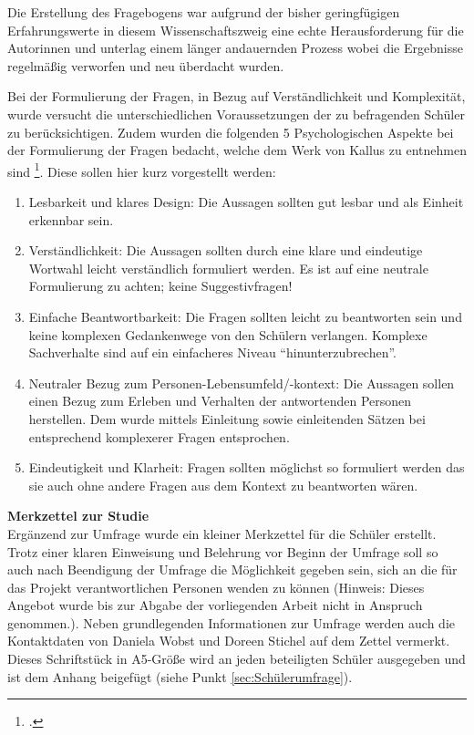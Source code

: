 Die Erstellung des Fragebogens war aufgrund der bisher geringfügigen Erfahrungswerte in diesem Wissenschaftszweig eine echte Herausforderung für die Autorinnen und unterlag einem länger andauernden Prozess wobei die Ergebnisse regelmäßig verworfen und neu überdacht wurden.
 
Bei der Formulierung der Fragen, in Bezug auf Verständlichkeit und Komplexität, wurde versucht die unterschiedlichen Voraussetzungen der zu befragenden Schüler zu berücksichtigen. Zudem wurden die folgenden 5 Psychologischen Aspekte bei der Formulierung der Fragen bedacht, welche dem Werk von Kallus zu entnehmen sind \footcite[vgl.][63-66]{Kallus2010}. Diese sollen hier kurz vorgestellt werden:

\begin{enumerate}
	\item Lesbarkeit und klares Design: Die Aussagen sollten gut lesbar und als Einheit erkennbar sein. 
	\item Verständlichkeit: Die Aussagen sollten durch eine klare und eindeutige Wortwahl leicht verständlich formuliert werden. Es ist auf eine neutrale Formulierung zu achten; keine Suggestivfragen!
	\item Einfache Beantwortbarkeit: Die Fragen sollten leicht zu beantworten sein und keine komplexen Gedankenwege von den Schülern verlangen. Komplexe Sachverhalte sind auf ein einfacheres Niveau "`hinunterzubrechen"'.
	\item Neutraler Bezug zum Personen-Lebensumfeld/-kontext: Die Aussagen sollen einen Bezug zum Erleben und Verhalten der antwortenden Personen herstellen. Dem wurde mittels Einleitung sowie einleitenden Sätzen bei entsprechend komplexerer Fragen entsprochen.
	\item Eindeutigkeit und Klarheit: Fragen sollten möglichst so formuliert werden das sie auch ohne andere Fragen aus dem Kontext zu beantworten wären.
\end{enumerate}

\noindent
\textbf{Merkzettel zur Studie}\\

\noindent
Ergänzend zur Umfrage wurde ein kleiner Merkzettel für die Schüler erstellt. Trotz einer klaren Einweisung und Belehrung vor Beginn der Umfrage soll so auch nach Beendigung der Umfrage die Möglichkeit gegeben sein, sich an die für das Projekt verantwortlichen Personen wenden zu können (Hinweis: Dieses Angebot wurde bis zur Abgabe der vorliegenden Arbeit nicht in Anspruch genommen.). Neben grundlegenden Informationen zur Umfrage werden auch die Kontaktdaten von Daniela Wobst und Doreen Stichel auf dem Zettel vermerkt. Dieses Schriftstück in A5-Größe wird an jeden beteiligten Schüler ausgegeben und ist dem Anhang beigefügt (siehe Punkt \ref{sec:Schülerumfrage}). \\


